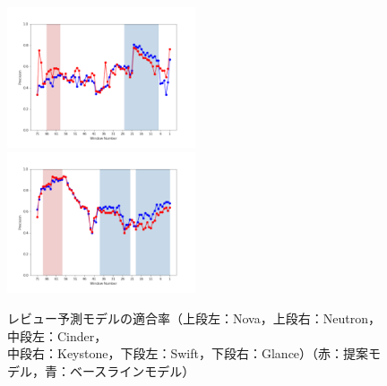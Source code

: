 \documentclass[11pt]{jreport}
\begin{document}
\begin{figure}[H]
\begin{minipage}{\textwidth}
\begin{center}
    \includegraphics[width=0.495\textwidth]{Uenaka_fig/RQ2_result/Swift_review_Precision.pdf}
    \includegraphics[width=0.495\textwidth]{Uenaka_fig/RQ2_result/Glance_review_Precision.pdf}
    \caption{レビュー予測モデルの適合率（上段左：Nova，上段右：Neutron，中段左：Cinder，\\ 中段右：Keystone，下段左：Swift，下段右：Glance）（赤：提案モデル，青：ベースラインモデル）}
    \label{fig:review_p}
\end{center}
\vspace{0.08\textheight}
\end{minipage}
\end{figure}
\end{document}
